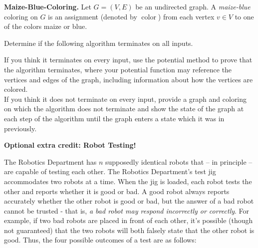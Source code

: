 \documentclass[11pt,addpoints]{exam}
\DeclareMathOperator{\col}{color}
\begin{document}
\begin{questions}
\begin{solution}

   \end{solution}


   \question[20] \textbf{Maize-Blue-Coloring.} Let $G = (V,E)$ be an undirected graph. A \emph{maize-blue} coloring on $G$ is an assignment (denoted by $\col$) from each vertex $v \in V$ to one of the colors maize or blue.
    
    Determine if the following algorithm terminates on all inputs. 


    \begin{minipage}{\linewidth}
    \begin{algorithm}[H]
    \begin{algorithmic}[1]
        \Statex{}
        \EndFor
        \Statex{}
        \EndWhile
        \EndFunction
    \end{algorithmic}
    \end{algorithm}
    \end{minipage}

    
    If you think it terminates on every input, use the potential method to prove that the algorithm terminates, where your potential function may reference the vertices and edges of the graph, including information about how the vertices are colored.\\
    If you think it does not terminate on every input, provide a graph and coloring on which the algorithm does not terminate and show the state of the graph at each step of the algorithm until the graph enters a state which it was in previously.


    \begin{solution}
 
    \end{solution}


\bonusquestion[3] \textbf{Optional extra credit: Robot Testing!} 

The Robotics Department has $n$ supposedly identical robots that  -- in principle -- are capable of testing each other.  The Robotics Department's test jig accommodates two robots at a time. When the jig is loaded, each robot tests the other and reports whether it is good or bad. A good robot always reports accurately whether the other robot is good or bad, but the answer of a bad robot cannot be trusted - that is, \textit{a bad robot may respond incorrectly or correctly}. For example, if two bad robots are placed in front of each other, it's possible (though not guaranteed) that the two robots will both falsely state that the other robot is good. Thus, the four possible outcomes of a test are as follows:


\end{questions}
\end{document}
